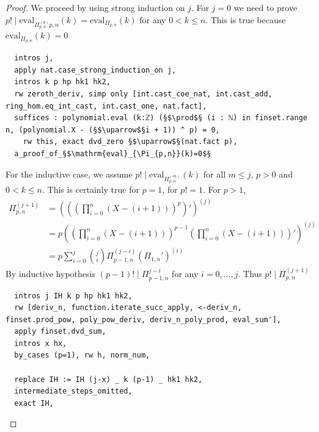 \documentclass{report}
\theoremstyle{definition}
\begin{document}
\begin{proof}
We proceed by using strong induction on $j$. For $j=0$ we need to prove $p!\mid\mathrm{eval}_{\Pi_{p,n}^{(0)}{p,n}}(k)=\mathrm{eval}_{\Pi_{p,n}}(k)$ for any $0<k\le n$. This is true because $\mathrm{eval}_{\Pi_{p,n}}(k)=0$
\begin{verbatim}
  intros j,
  apply nat.case_strong_induction_on j,
  intros k p hp hk1 hk2,
  rw zeroth_deriv, simp only [int.cast_coe_nat, int.cast_add, ring_hom.eq_int_cast, int.cast_one, nat.fact],
  suffices : polynomial.eval (k:ℤ) (§$\prod$§ (i : ℕ) in finset.range n, (polynomial.X - (§$\uparrow$§i + 1)) ^ p) = 0,
    rw this, exact dvd_zero §$\uparrow$§(nat.fact p),
  a_proof_of_§$\mathrm{eval}_{\Pi_{p,n}}(k)=0$§
\end{verbatim}
For the inductive case, we assume $p!\mid\mathrm{eval}_{\Pi_{p,n}^{(m)}}(k)$ for all $m\le j$, $p>0$ and $0<k\le n$. This is certainly true for $p=1$, for $p!=1$. For $p>1$,
\begin{equation*}
\begin{aligned}
\Pi_{p,n}^{(j+1)}&=\left(\left(\left(\prod_{i=0}^n(X-(i+1))\right)^p\right)'\right)^{(j)}\\
  &=p\left(\left(\prod_{i=0}^n(X-(i+1))\right)^{p-1}\left(\prod_{i=0}^n(X-(i+1))\right)'\right)^{(j)}\\
  &=p\sum_{i=0}^j{j\choose i}\Pi_{p-1,n}^{(j-i)}\left(\Pi_{1,n}'\right)^{(i)}
\end{aligned}
\end{equation*}
By inductive hypothesis $(p-1)!\mid\Pi_{p-1,n}^{j-i}$ for any $i=0,\dots,j$. Thus $p!\mid\Pi_{p,n}^{(j+1)}$
\begin{verbatim}
  intros j IH k p hp hk1 hk2,
  rw [deriv_n, function.iterate_succ_apply, <-deriv_n, finset.prod_pow, poly_pow_deriv, deriv_n_poly_prod, eval_sum'],
  apply finset.dvd_sum,
  intros x hx,
  by_cases (p=1), rw h, norm_num,

  replace IH := IH (j-x) _ k (p-1) _ hk1 hk2,
  intermediate_steps_omitted,
  exact IH,
\end{verbatim}
\end{proof}
\end{document}
